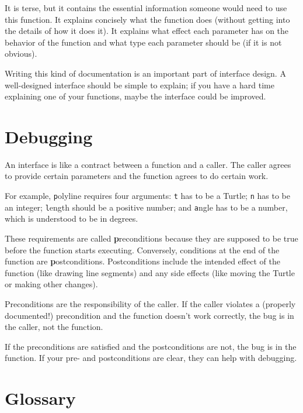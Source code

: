 \documentclass[
DIV=11,
fontsize=13,
twoside,
headinclude=false,
titlepage=firstiscover,
abstract=true,
headsepline=true,
footsepline=true,
chapterprefix=true, %
headings=big,
bibliography=totoc,%
captions=tableheading
]{scrbook}
\theoremstyle{definition}
\begin{document}
It is terse, but it contains the essential information
someone would need to use this function.  It explains concisely what
the function does (without getting into the details of how it does
it).  It explains what effect each parameter has on the behavior of
the function and what type each parameter should be (if it is not
obvious).

Writing this kind of documentation is an important part of interface
design.  A well-designed interface should be simple to explain;
if you have a hard time explaining one of your functions,
maybe the interface could be improved.


\section{Debugging}

An interface is like a contract between a function and a caller.
The caller agrees to provide certain parameters and the function
agrees to do certain work.

For example, {\texttt polyline} requires four arguments: {\texttt t} has to be
a Turtle; {\texttt n} has to be an
integer; {\texttt length} should be a positive number; and {\texttt
  angle} has to be a number, which is understood to be in degrees.

These requirements are called {\textbf preconditions} because they
are supposed to be true before the function starts executing.
Conversely, conditions at the end of the function are
{\textbf postconditions}.  Postconditions include the intended
effect of the function (like drawing line segments) and any
side effects (like moving the Turtle or making other changes).

Preconditions are the responsibility of the caller.  If the caller
violates a (properly documented!) precondition and the function
doesn't work correctly, the bug is in the caller, not the function.

If the preconditions are satisfied and the postconditions are
not, the bug is in the function.  If your pre- and postconditions
are clear, they can help with debugging.


\section{Glossary}
\end{document}
